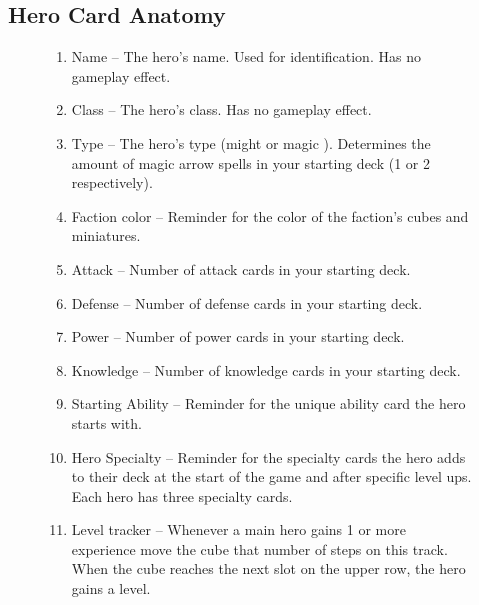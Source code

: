 \documentclass[12pt]{article}
\def\assets{assets}
\def\images{\assets/images}
\def\svgs{\assets/svgs}
\begin{document}
\subsection*{\hypertarget{Herocard}{Hero Card Anatomy}}
\bigbreak
\begin{figure}[h]
  \begin{minipage}[t]{0.5\textwidth}
    \vspace{0pt}
    \begin{enumerate}[itemsep=5pt]
      \item Name – The hero’s name. Used for identification. Has no gameplay effect.
      \item Class – The hero’s class. Has no gameplay effect.
      \item Type – The hero’s type (might  or magic ). Determines the amount of magic arrow spells in your starting deck (1 or 2 respectively).
      \item Faction color – Reminder for the color of the faction’s cubes and miniatures.
      \item Attack – Number of attack cards in your starting deck.
      \item Defense – Number of defense cards in your starting deck.
      \item Power – Number of power cards in your starting deck.
      \item Knowledge – Number of knowledge cards in your starting deck.
      \item Starting Ability – Reminder for the unique ability card the hero starts with.
      \item Hero Specialty – Reminder for the specialty cards the hero adds to their deck at the start of the game and after specific level ups. Each hero has three specialty cards.
      \item Level tracker – Whenever a main hero gains 1 or more experience  move the cube that number of steps on this track. When the cube reaches the next slot on the upper row, the hero gains a level.
    \end{enumerate}
  \end{minipage}\hfill
  \begin{minipage}[t]{0.48\textwidth}
    \centering
    \vspace{0pt}
    \begin{scriptsize}
\end{scriptsize}
\end{minipage}
\end{figure}
\end{document}
